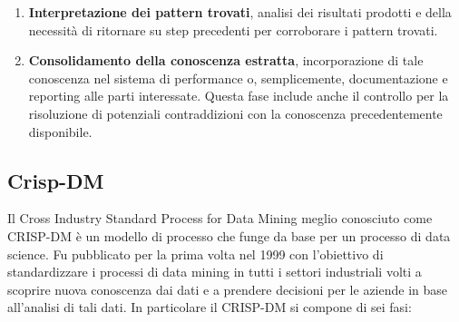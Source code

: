 \documentclass[italian,12pt,a4paper]{article}
\begin{document}
\begin{enumerate}
        \item \textbf{Interpretazione dei pattern trovati}, analisi dei risultati prodotti e della necessità di ritornare su step precedenti per corroborare i pattern trovati.
        \item \textbf{Consolidamento della conoscenza estratta}, incorporazione di tale conoscenza nel sistema di performance o, semplicemente, documentazione e reporting alle parti interessate. Questa fase include anche il controllo per la risoluzione di potenziali contraddizioni con la conoscenza precedentemente disponibile.
	\end{enumerate}

    \vspace{25pt}
    
    \subsection{Crisp-DM}
    Il  Cross  Industry Standard  Process for  Data  Mining meglio conosciuto come CRISP-DM  è un modello di processo che funge da base per un processo di  data science. Fu pubblicato per la prima volta nel 1999 con l'obiettivo di standardizzare i processi di data mining in tutti i settori industriali volti a scoprire nuova conoscenza dai dati e a prendere decisioni per le aziende in base all'analisi di tali dati. In particolare il CRISP-DM si compone di sei fasi:
	
\end{document}
